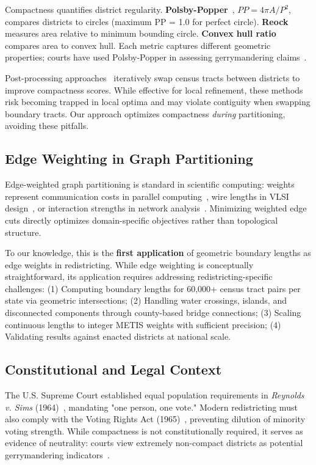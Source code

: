 Compactness quantifies district regularity. \textbf{Polsby-Popper}~\cite{polsby1991third}, $PP = 4\pi A / P^2$, compares districts to circles (maximum PP = 1.0 for perfect circle). \textbf{Reock}~\cite{reock1961measuring} measures area relative to minimum bounding circle. \textbf{Convex hull ratio} compares area to convex hull. Each metric captures different geometric properties; courts have used Polsby-Popper in assessing gerrymandering claims~\cite{pildes2004democracy}.

Post-processing approaches~\cite{ricca2008local,swamy2011least} iteratively swap census tracts between districts to improve compactness scores. While effective for local refinement, these methods risk becoming trapped in local optima and may violate contiguity when swapping boundary tracts. Our approach optimizes compactness \textit{during} partitioning, avoiding these pitfalls.

\subsection{Edge Weighting in Graph Partitioning}

Edge-weighted graph partitioning is standard in scientific computing: weights represent communication costs in parallel computing~\cite{hendrickson1995graph}, wire lengths in VLSI design~\cite{alpert1995spectral}, or interaction strengths in network analysis~\cite{karypis1999multilevel}. Minimizing weighted edge cuts directly optimizes domain-specific objectives rather than topological structure.

To our knowledge, this is the \textbf{first application} of geometric boundary lengths as edge weights in redistricting. While edge weighting is conceptually straightforward, its application requires addressing redistricting-specific challenges: (1) Computing boundary lengths for 60,000+ census tract pairs per state via geometric intersections; (2) Handling water crossings, islands, and disconnected components through county-based bridge connections; (3) Scaling continuous lengths to integer METIS weights with sufficient precision; (4) Validating results against enacted districts at national scale.

\subsection{Constitutional and Legal Context}

The U.S. Supreme Court established equal population requirements in \textit{Reynolds v. Sims} (1964)~\cite{reynolds-v-sims}, mandating "one person, one vote." Modern redistricting must also comply with the Voting Rights Act (1965)~\cite{voting-rights-act}, preventing dilution of minority voting strength. While compactness is not constitutionally required, it serves as evidence of neutrality: courts view extremely non-compact districts as potential gerrymandering indicators~\cite{stephanopoulos2015partisan}.

